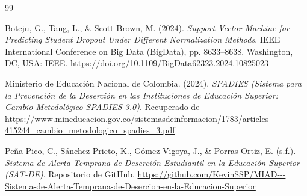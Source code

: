 \documentclass[12pt,a4paper]{article}
\begin{document}
\begin{thebibliography}{99}

Boteju, G., Tang, L., \& Scott Brown, M. (2024). 
\textit{Support Vector Machine for Predicting Student Dropout Under Different Normalization Methods}. 
IEEE International Conference on Big Data (BigData), pp. 8633--8638. Washington, DC, USA: IEEE. 
\url{https://doi.org/10.1109/BigData62323.2024.10825023}

Ministerio de Educación Nacional de Colombia. (2024). 
\textit{SPADIES (Sistema para la Prevención de la Deserción en las Instituciones de Educación Superior: Cambio Metodológico SPADIES 3.0)}. 
Recuperado de \url{https://www.mineducacion.gov.co/sistemasdeinformacion/1783/articles-415244_cambio_metodologico_spadies_3.pdf}

Peña Pico, C., Sánchez Prieto, K., Gómez Vigoya, J., \& Porras Ortiz, E. (s.f.). 
\textit{Sistema de Alerta Temprana de Deserción Estudiantil en la Educación Superior (SAT-DE)}. 
Repositorio de GitHub. 
\url{https://github.com/KevinSSP/MIAD---Sistema-de-Alerta-Temprana-de-Desercion-en-la-Educacion-Superior}

\end{thebibliography}
\end{document}
